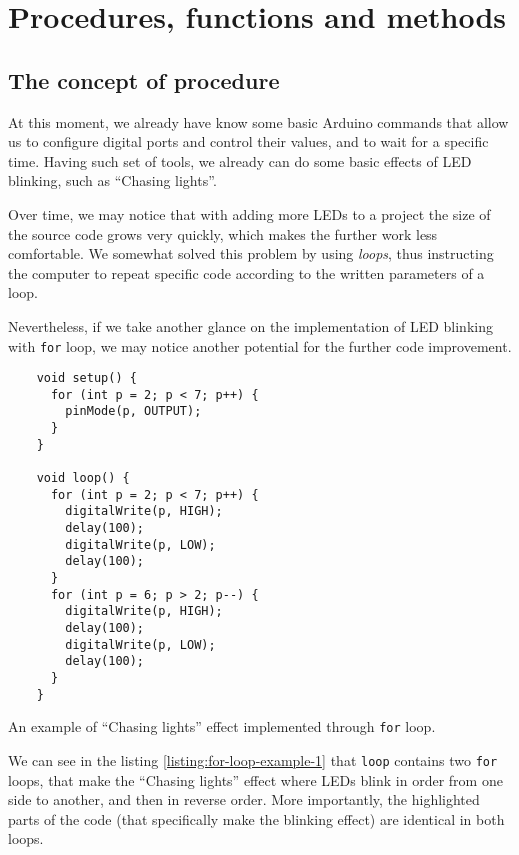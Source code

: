 \documentclass[../sparc.tex]{subfiles}
\begin{document}
\newpage
\section{Procedures, functions and methods}

\subsection{The concept of procedure}

At this moment, we already have know some basic Arduino commands that allow us
to configure digital ports and control their values, and to wait for a specific
time.  Having such set of tools, we already can do some basic effects of LED
blinking, such as ``Chasing lights''.

Over time, we may notice that with adding more LEDs to a project the size of the
source code grows very quickly, which makes the further work less comfortable.
We somewhat solved this problem by using \emph{loops}, thus instructing the
computer to repeat specific code according to the written parameters of a loop.

Nevertheless, if we take another glance on the implementation of LED blinking
with \texttt{for} loop, we may notice another potential for the further
code improvement.

\begin{listing}[ht]
  \begin{verbatim}
    void setup() {
      for (int p = 2; p < 7; p++) {
        pinMode(p, OUTPUT);
      }
    }

    void loop() {
      for (int p = 2; p < 7; p++) {
        digitalWrite(p, HIGH);
        delay(100);
        digitalWrite(p, LOW);
        delay(100);
      }
      for (int p = 6; p > 2; p--) {
        digitalWrite(p, HIGH);
        delay(100);
        digitalWrite(p, LOW);
        delay(100);
      }
    }
  \end{verbatim}
  \label{listing:for-loop-example-1}
  \caption{An example of ``Chasing lights'' effect implemented through
    \texttt{for} loop.}
\end{listing}

We can see in the listing \ref{listing:for-loop-example-1} that
\texttt{loop} contains two \texttt{for} loops, that make the
``Chasing lights'' effect where LEDs blink in order from one side to another,
and then in reverse order.  More importantly, the highlighted parts of the code
(that specifically make the blinking effect) are identical in both loops.
\end{document}
